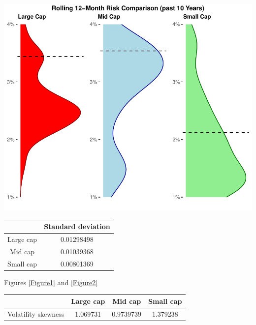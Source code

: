 \documentclass[11pt,preprint, authoryear]{elsarticle}
\let\origtable\table
\let\endorigtable\endtable
\renewenvironment{table}[1][2] {
    \expandafter\origtable\expandafter[H]
} {
    \endorigtable
}
\numberwithin{equation}{section}
\numberwithin{figure}{section}
\numberwithin{table}{section}
\begin{document}
\includegraphics{Volatility-of-Shares_files/figure-latex/unnamed-chunk-1-1.pdf}

\begin{table}[h]
\begin{center}
    \begin{tabular}{| c | c |}
    \hline
         & Standard deviation \\
        \hline
        Large cap & 0.01298498 \\
        Mid cap & 0.01039368 \\
        Small cap & 0.00801369 \\
        \hline
    \end{tabular}
    \caption{Standard deviation}
    \label{tab:SD}
\end{center}
\end{table}

Figures \ref{Figure1} and \ref{Figure2}

\begin{table}[h]
\begin{center}
    \begin{tabular}{| c | c | c | c |}
    \hline
         & Large cap & Mid cap & Small cap \\
        \hline
        Volatility skewness & 1.069731 & 0.9739739 & 1.379238 \\
        \hline
    \end{tabular}
    \caption{Volatility skewness}
    \label{tab:VS}
\end{center}
\end{table}
\end{document}
